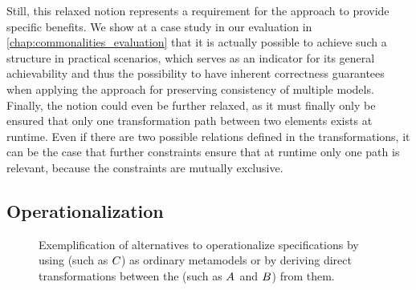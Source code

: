 Still, this relaxed notion represents a requirement for the \commonalities approach to provide specific benefits.
We show at a case study in our evaluation in \autoref{chap:commonalities_evaluation} that it is actually possible to achieve such a structure in practical scenarios, which serves as an indicator for its general achievability and thus the possibility to have inherent correctness guarantees when applying the \commonalities approach for preserving consistency of multiple models.
Finally, the notion could even be further relaxed, as it must finally only be ensured that only one transformation path between two elements exists at runtime.
Even if there are two possible relations defined in the transformations, it can be the case that further constraints ensure that at runtime only one path is relevant, because the constraints are mutually exclusive.


\subsection{Operationalization}
\label{chap:improvement:commonalities:operationalization}

\begin{figure}
    \centering
    
    \caption[Alternatives for \commonalities operationalization]{Exemplification of alternatives to operationalize \commonalities specifications by using \conceptmetamodels (such as $\metamodel{C}{}$) as ordinary metamodels or by deriving direct transformations between the \concretemetamodels (such as $\metamodel{A}{}$ and $\metamodel{B}{}$) from them.}
    \label{fig:improvement:operationalization_alternatives}
\end{figure}

